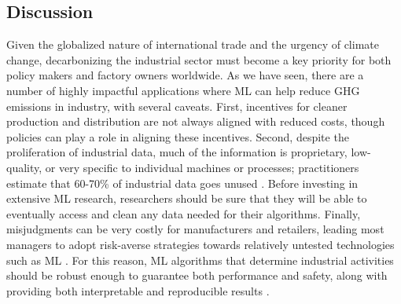 \documentclass[11pt]{report}
\begin{document}
\subsection{Discussion}
\label{sec:industrydiscussion}
Given the globalized nature of international trade and the urgency of climate change, decarbonizing the industrial sector must become a key priority for both policy makers and factory owners worldwide.  As we have seen, there are a number of highly impactful applications where ML can help reduce GHG emissions in industry, with several caveats. First, incentives for cleaner production and distribution are not always aligned with reduced costs, though policies can play a role in aligning these incentives. Second, despite the proliferation of industrial data, much of the information is proprietary, low-quality, or very specific to individual machines or processes; practitioners estimate that 60-70\% of industrial data goes unused \cite{Coffey2019, Gualtieri2016}. Before investing in extensive ML research, researchers should be sure that they will be able to eventually access and clean any data needed for their algorithms. Finally, misjudgments can be very costly for manufacturers and retailers, leading most managers to adopt risk-averse strategies towards relatively untested technologies such as ML \cite{helper2019profits}. For this reason, ML algorithms that determine industrial activities should be robust enough to guarantee both performance and safety, along with providing both interpretable and reproducible results \cite{henderson2018deep}.
\end{document}
